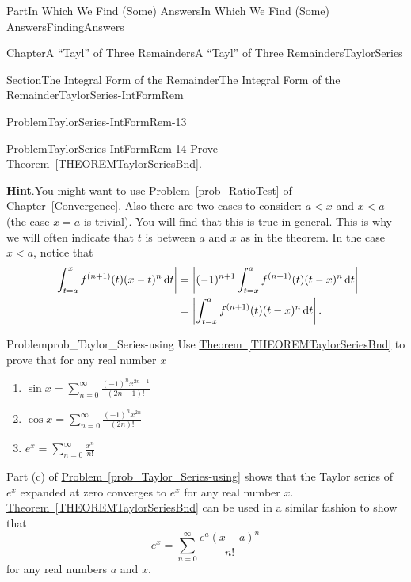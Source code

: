 \documentclass[oneside,10pt,]{book}
\newcommand{\blocktitlefont}{\relax}
\newcommand{\xreffont}{\relax}
\numberwithin{equation}{part}
\newcommand{\dx}[1]{\,{\rm d}#1}
\newcommand{\lt}{<}
\newcommand{\amp}{&}
\begin{document}
\begin{partptx}{Part}{In Which We Find (Some) Answers}{}{In Which We Find (Some) Answers}{}{}{FindingAnswers}
\begin{chapterptx}{Chapter}{A ``Tayl'' of Three Remainders}{}{A ``Tayl'' of Three Remainders}{}{}{TaylorSeries}
\begin{sectionptx}{Section}{The Integral Form of the Remainder}{}{The Integral Form of the Remainder}{}{}{TaylorSeries-IntFormRem}
\begin{problem}{Problem}{}{TaylorSeries-IntFormRem-13}
\end{problem}
\begin{problem}{Problem}{}{TaylorSeries-IntFormRem-14}%
Prove \hyperref[THEOREMTaylorSeriesBnd]{Theorem~{\xreffont\ref{THEOREMTaylorSeriesBnd}}}.%
\par\smallskip%
\noindent\textbf{\blocktitlefont Hint}.\hypertarget{TaylorSeries-IntFormRem-14-3}{}\quad{}You might want to use \hyperref[prob_RatioTest]{Problem~{\xreffont\ref{prob_RatioTest}}} of \hyperref[Convergence]{Chapter~{\xreffont\ref{Convergence}}}.  Also there are two cases to consider: \(a\lt x\) and \(x\lt a\) (the case \(x=a\) is trivial).  You will find that this is true in general.  This is why we will often indicate that \(t\) is between \(a\) and \(x\) as in the theorem.  In the case \(x\lt a\), notice that%
\begin{align*}
\left|\int_{t=a}^xf^{(n+1)}(t)(x-t)^n\dx{ t}\right|\amp =\left|(-1)^{n+1}\int_{t=x}^af^{(n+1)}(t)(t-x)^n\dx{ t}\right|\\
\amp =\left|\int_{t=x}^af^{(n+1)}(t)(t-x)^n\dx{ t}\right|.
\end{align*}
%
\end{problem}
\begin{problem}{Problem}{}{prob_Taylor_Series-using}%
Use \hyperref[THEOREMTaylorSeriesBnd]{Theorem~{\xreffont\ref{THEOREMTaylorSeriesBnd}}} to prove that for any real number \(x\)%
\begin{enumerate}[font=\bfseries,label=(\alph*),ref=\alph*]%
\item{}\(\displaystyle\sin x=\sum_{n=0}^\infty\frac{(-1)^nx^{2n+1}}{(2n+1)!}\)%
\item{}\(\displaystyle\cos x= \sum_{n=0}^\infty\frac{(-1)^nx^{2n}}{(2n)!}\)%
\item\label{prob_Taylor_Series-using-c}\(\displaystyle e^x=\sum_{n=0}^\infty\frac{x^n}{n!}\)%
\end{enumerate}%
\end{problem}
Part (c) of \hyperref[prob_Taylor_Series-using]{Problem~{\xreffont\ref{prob_Taylor_Series-using}}}  shows that the Taylor series of \(e^x\) expanded at zero converges to \(e^x\) for any real number \(x\).  \hyperref[THEOREMTaylorSeriesBnd]{Theorem~{\xreffont\ref{THEOREMTaylorSeriesBnd}}} can be used in a similar fashion to show that%
\begin{equation*}
e^x=\sum_{n=0}^\infty\frac{e^a(x-a)^n}{n!}
\end{equation*}
for any real numbers \(a\) and \(x\).%
\par

\end{sectionptx}
\end{chapterptx}
\end{partptx}
\end{document}
